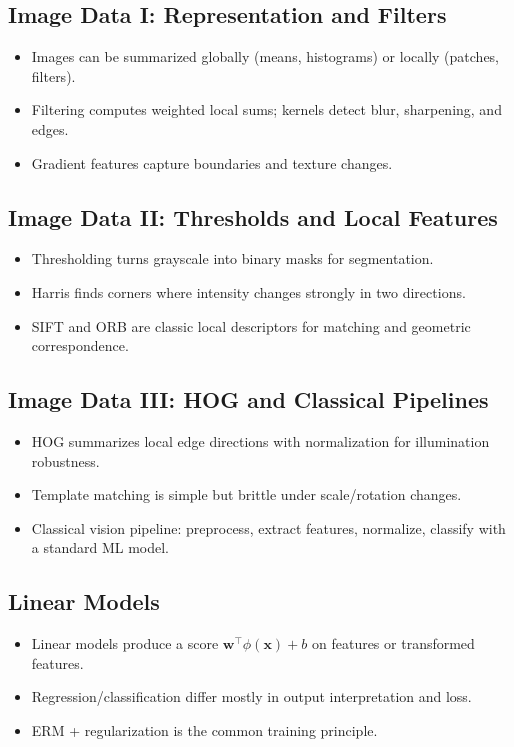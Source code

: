 \documentclass[10pt,twocolumn]{article}
\newcommand{\x}{\mathbf{x}}
\newcommand{\w}{\mathbf{w}}
\begin{document}
\subsection{Image Data I: Representation and Filters}
\begin{itemize}
  \item Images can be summarized globally (means, histograms) or locally (patches, filters).
  \item Filtering computes weighted local sums; kernels detect blur, sharpening, and edges.
  \item Gradient features capture boundaries and texture changes.
\end{itemize}

\subsection{Image Data II: Thresholds and Local Features}
\begin{itemize}
  \item Thresholding turns grayscale into binary masks for segmentation.
  \item Harris finds corners where intensity changes strongly in two directions.
  \item SIFT and ORB are classic local descriptors for matching and geometric correspondence.
\end{itemize}

\subsection{Image Data III: HOG and Classical Pipelines}
\begin{itemize}
  \item HOG summarizes local edge directions with normalization for illumination robustness.
  \item Template matching is simple but brittle under scale/rotation changes.
  \item Classical vision pipeline: preprocess, extract features, normalize, classify with a standard ML model.
\end{itemize}

\subsection{Linear Models}
\begin{itemize}
  \item Linear models produce a score $\w^\top\phi(\x)+b$ on features or transformed features.
  \item Regression/classification differ mostly in output interpretation and loss.
  \item ERM + regularization is the common training principle.
\end{itemize}
\end{document}
